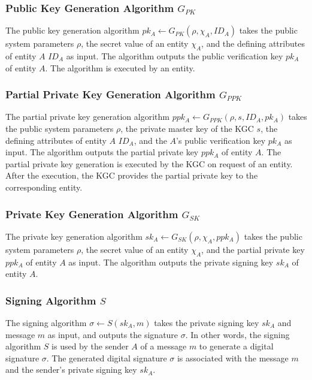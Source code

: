 \subsubsection{Public Key Generation Algorithm $G_{PK}$}
The public key generation algorithm $pk_A \leftarrow G_{PK}(\rho, \chi_A, ID_A)$ takes the public system parameters $\rho$, the secret value of an entity $\chi_A$, and the defining attributes of entity $A$ $ID_A$ as input.
The algorithm outputs the public verification key $pk_A$ of entity $A$.
The algorithm is executed by an entity.

\subsubsection{Partial Private Key Generation Algorithm $G_{PPK}$}
The partial private key generation algorithm $ppk_A \leftarrow G_{PPK}(\rho, s, ID_A, pk_A)$ takes the public system parameters $\rho$, the private master key of the KGC $s$, the defining attributes of entity $A$ $ID_A$, and the $A$'s public verification key $pk_A$ as input.
The algorithm outputs the partial private key $ppk_A$ of entity $A$.
The partial private key generation is executed by the KGC on request of an entity.
After the execution, the KGC provides the partial private key to the corresponding entity.

\subsubsection{Private Key Generation Algorithm $G_{SK}$}
The private key generation algorithm $sk_A \leftarrow G_{SK}(\rho, \chi_A, ppk_A)$ takes the public system parameters $\rho$, the secret value of an entity $\chi_A$, and the partial private key $ppk_A$ of entity $A$ as input.
The algorithm outputs the private signing key $sk_A$ of entity $A$.

\subsubsection{Signing Algorithm $S$}
The signing algorithm $\sigma \leftarrow S(sk_A, m)$ takes the private signing key $sk_A$ and message $m$ as input, and outputs the signature $\sigma$.
In other words, the signing algorithm $S$ is used by the sender $A$ of a message $m$ to generate a digital signature $\sigma$.
The generated digital signature $\sigma$ is associated with the message $m$ and the sender's private signing key $sk_A$.

